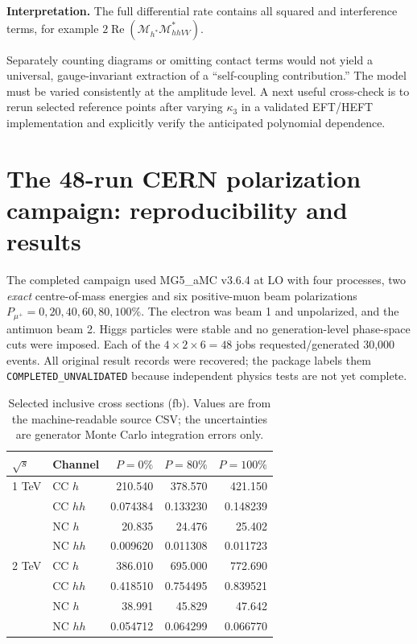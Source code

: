 \documentclass[12pt,a4paper]{article}
\newcommand{\newnote}{\clearpage}
\begin{document}
\textbf{Interpretation.} The full differential rate contains all squared and interference terms, for example $2\operatorname{Re}(\mathcal M_{h^*}\mathcal M_{hhVV}^*)$.\par Separately counting diagrams or omitting contact terms would not yield a universal, gauge-invariant extraction of a ``self-coupling contribution.'' The model must be varied consistently at the amplitude level. A next useful cross-check is to rerun selected reference points after varying $\kappa_3$ in a validated EFT/HEFT implementation and explicitly verify the anticipated polynomial dependence.




\newnote

\section{The 48-run CERN polarization campaign: reproducibility and results}
The completed campaign used MG5\_aMC v3.6.4 at LO with four processes, two \emph{exact} centre-of-mass energies and six positive-muon beam polarizations $P_{\mu^+}=0,20,40,60,80,100\%$. The electron was beam 1 and unpolarized, and the antimuon beam 2. Higgs particles were stable and no generation-level phase-space cuts were imposed. Each of the $4\times2\times6=48$ jobs requested/generated 30,000 events. All original result records were recovered; the package labels them \texttt{COMPLETED\_UNVALIDATED} because independent physics tests are not yet complete.

\begin{table}[H]
\centering\small
\caption{Selected inclusive cross sections (fb). Values are from the machine-readable source CSV; the uncertainties are generator Monte Carlo integration errors only.}
\begin{tabular}{@{}llrrr@{}}\toprule
$\sqrt{s}$ & Channel & $P=0\%$ & $P=80\%$ & $P=100\%$\\\midrule
1 TeV & CC $h$ & 210.540 & 378.570 & 421.150\\
 & CC $hh$ & 0.074384 & 0.133230 & 0.148239\\
 & NC $h$ & 20.835 & 24.476 & 25.402\\
 & NC $hh$ & 0.009620 & 0.011308 & 0.011723\\\midrule
2 TeV & CC $h$ & 386.010 & 695.000 & 772.690\\
 & CC $hh$ & 0.418510 & 0.754495 & 0.839521\\
 & NC $h$ & 38.991 & 45.829 & 47.642\\
 & NC $hh$ & 0.054712 & 0.064299 & 0.066770\\\bottomrule
\end{tabular}
\end{table}
\end{document}
